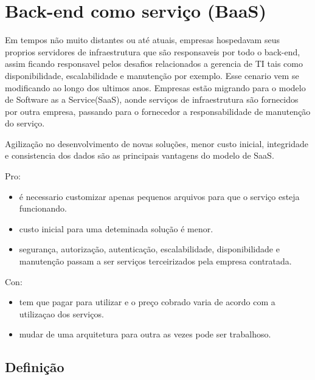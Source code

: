 \chapter{Back-end como serviço (BaaS)}


	Em tempos não muito distantes ou até atuais, empresas hospedavam seus proprios servidores de infraestrutura que são responsaveis por todo o back-end, assim ficando responsavel pelos desafios relacionados a gerencia de TI tais como disponibilidade, escalabilidade e manutenção por exemplo. Esse cenario vem se modificando ao longo dos ultimos anos. Empresas estão migrando para o modelo de Software as a Service(SaaS), aonde serviços de infraestrutura são fornecidos por outra empresa, passando para o fornecedor a responsabilidade de manutenção do serviço. 

	Agilização no desenvolvimento de novas soluções, menor custo inicial, integridade e consistencia dos dados são as principais vantagens do modelo de SaaS.
		
	\noindent Pro:
	\begin{itemize}		
		\item é necessario customizar apenas pequenos arquivos para que o serviço esteja funcionando.
		\item custo inicial para uma deteminada solução é menor.
		\item segurança, autorização, autenticação, escalabilidade, disponibilidade e manutenção passam a ser serviços terceirizados pela empresa contratada.
	\end{itemize}

	\noindent Con: 
	\begin{itemize}

		\item tem que pagar para utilizar e o preço cobrado varia de acordo com a utilizaçao dos serviços.
		\item mudar de uma arquitetura para outra as vezes pode ser trabalhoso.

	\end{itemize}

\section{Definição}
	
